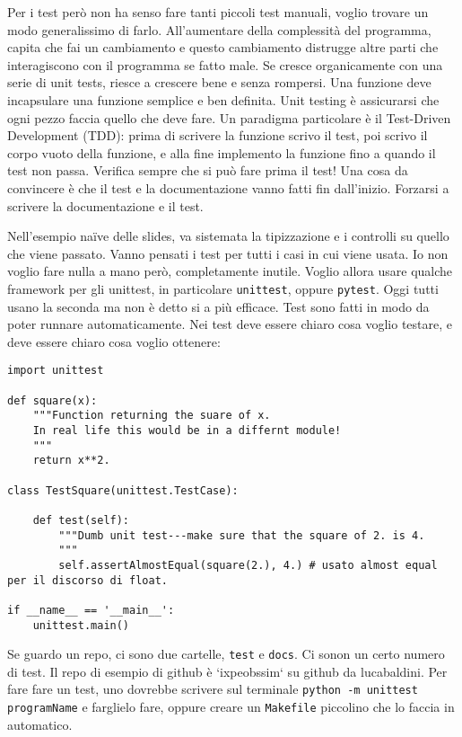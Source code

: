 \documentclass[10pt, a4paper, titlepage]{book}
\begin{document}
Per i test però non ha senso fare tanti piccoli test manuali, voglio trovare un modo generalissimo di farlo. All'aumentare della complessità del programma, capita che fai un cambiamento e questo cambiamento distrugge altre parti che interagiscono con il programma se fatto male.
Se cresce organicamente con una serie di unit tests, riesce a crescere bene e senza rompersi.
Una funzione deve incapsulare una funzione semplice e ben definita. Unit testing è assicurarsi che ogni pezzo faccia quello che deve fare.
Un paradigma particolare è il Test-Driven Development (TDD): prima di scrivere la funzione scrivo il test, poi scrivo il corpo vuoto della funzione, e alla fine implemento la funzione fino a quando il test non passa. Verifica sempre che si può fare prima il test!
Una cosa da convincere è che il test e la documentazione vanno fatti fin dall'inizio.
Forzarsi a scrivere la documentazione e il test.

Nell'esempio naïve delle slides, va sistemata la tipizzazione e i controlli su quello che viene passato. Vanno pensati i test per tutti i casi in cui viene usata.
Io non voglio fare nulla a mano però, completamente inutile. Voglio allora usare qualche framework per gli unittest, in particolare \texttt{unittest}, oppure \texttt{pytest}. Oggi tutti usano la seconda ma non è detto si a più efficace.
Test sono fatti in modo da poter runnare automaticamente. Nei test deve essere chiaro cosa voglio testare, e deve essere chiaro cosa voglio ottenere:
\begin{verbatim}
import unittest

def square(x):
	"""Function returning the suare of x.
	In real life this would be in a differnt module!
	"""
	return x**2.

class TestSquare(unittest.TestCase):

	def test(self):
		"""Dumb unit test---make sure that the square of 2. is 4.
		"""
		self.assertAlmostEqual(square(2.), 4.) # usato almost equal per il discorso di float.

if __name__ == '__main__':
	unittest.main()	
\end{verbatim}

Se guardo un repo, ci sono due cartelle, \texttt{test} e \texttt{docs}. Ci sonon un certo numero di test. Il repo di esempio di github è `ixpeobssim` su github da lucabaldini.
Per fare fare un test, uno dovrebbe scrivere sul terminale \texttt{python -m unittest programName} e farglielo fare, oppure creare un \texttt{Makefile} piccolino che lo faccia in automatico.
\end{document}
